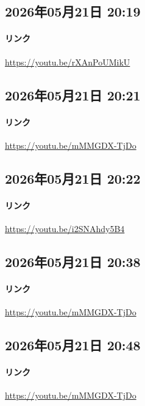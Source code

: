 \subsection*{2026年05月21日 20:19}

\paragraph{リンク}
\url{https://youtu.be/rXAnPoUMikU}

\subsection*{2026年05月21日 20:21}

\paragraph{リンク}
\url{https://youtu.be/mMMGDX-TjDo}

\subsection*{2026年05月21日 20:22}

\paragraph{リンク}
\url{https://youtu.be/i2SNAhdy5B4}

\subsection*{2026年05月21日 20:38}

\paragraph{リンク}
\url{https://youtu.be/mMMGDX-TjDo}

\subsection*{2026年05月21日 20:48}

\paragraph{リンク}
\url{https://youtu.be/mMMGDX-TjDo}

